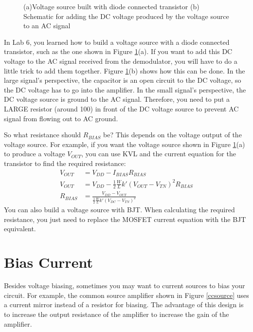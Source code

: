 \documentclass{article}
\begin{document}
\begin{figure}[!htb]
  
  \centerline{\box\graph}
  \caption{(a)Voltage source built with diode connected transistor  (b) Schematic for adding the DC voltage produced by the voltage source to an AC signal}
  \label{voltagesource}
\end{figure}

In Lab 6, you learned how to build a voltage source with a diode connected transistor, such as the one shown in Figure \ref{voltagesource}(a). If you want to add this DC voltage to the AC signal received from the demodulator, you will have to do a little trick to add them together. Figure \ref{voltagesource}(b) shows how this can be done. In the large signal's perspective, the capacitor is an open circuit to the DC voltage, so the DC voltage has to go into the amplifier. In the small signal's perspective, the DC voltage source is ground to the AC signal. Therefore, you need to put a LARGE resistor (around \unit{100}{\kilo\ohm}) in front of the DC voltage source to prevent AC signal from flowing out to AC ground. 

So what resistance should $R_{BIAS}$ be? This depends on the voltage output of the voltage source. For example, if you want the voltage source shown in Figure \ref{voltagesource}(a) to produce a voltage $V_{OUT}$, you can use KVL and the current equation for the transistor to find the required resistance:
\begin{align*}
  	V_{OUT} &= V_{DD} - I_{BIAS}R_{BIAS} \\
	V_{OUT} &= V_{DD} - \frac{1}{2}\frac{W}{L}k'\left(V_{OUT}-V_{TN}\right)^2R_{BIAS} \\
	R_{BIAS} &= \frac{V_{DD} - V_{OUT}}{\frac{1}{2}\frac{W}{L}k'\left(V_{DC}-V_{TN}\right)^2} 
\end{align*}
You can also build a voltage source with BJT. When calculating the required resistance, you just need to replace the MOSFET current equation with the BJT equivalent. 

\section{Bias Current}

Besides voltage biasing, sometimes you may want to current sources to bias your circuit. For example, the common source amplifier shown in Figure \ref{ccsource} uses a current mirror instead of a resistor for biasing. The advantage of this design is to increase the output resistance of the amplifier to increase the gain of the amplifier.
\end{document}
